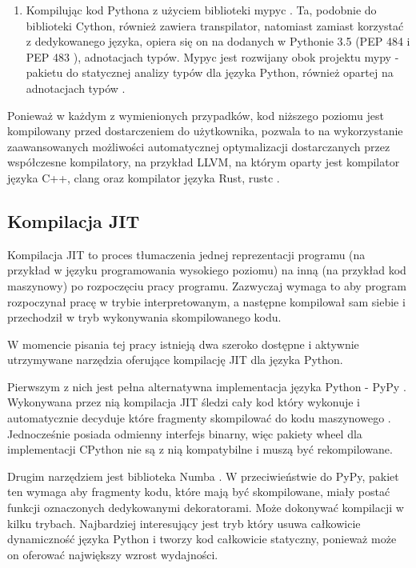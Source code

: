 \documentclass[11pt, a4paper]{article}
\begin{document}
\begin{sloppypar}
\begin{enumerate}
      \item Kompilując kod Pythona z użyciem biblioteki mypyc \cite{mypyc}. Ta, podobnie
        do biblioteki Cython, również zawiera transpilator, natomiast zamiast korzystać z
        dedykowanego języka, opiera się on na dodanych w Pythonie 3.5 \cite{Python_3_5}
        (PEP 484 \cite{PEP_484} i PEP 483 \cite{PEP_483}), adnotacjach typów. Mypyc jest
        rozwijany obok projektu mypy - pakietu do statycznej analizy typów dla języka
        Python, również opartej na adnotacjach typów \cite{mypy}.
    \end{enumerate}

    Ponieważ w każdym z wymienionych przypadków, kod niższego poziomu jest kompilowany
    przed dostarczeniem do użytkownika, pozwala to na wykorzystanie zaawansowanych możliwości
    automatycznej optymalizacji dostarczanych przez współczesne kompilatory, na przykład
    LLVM, na którym oparty jest kompilator języka C++, clang \cite{ClangHomePage} oraz
    kompilator języka Rust, rustc \cite{Rustc}.

    \subsection{Kompilacja JIT}
    Kompilacja JIT to proces tłumaczenia jednej reprezentacji programu (na przykład w
    języku programowania wysokiego poziomu) na inną (na przykład kod maszynowy) po rozpoczęciu
    pracy programu. Zazwyczaj wymaga to aby program rozpoczynał pracę w trybie
    interpretowanym, a następne kompilował sam siebie i przechodził w tryb wykonywania skompilowanego
    kodu.

    W momencie pisania tej pracy istnieją dwa szeroko dostępne i aktywnie utrzymywane narzędzia
    oferujące kompilację JIT dla języka Python.

    Pierwszym z nich jest pełna alternatywna implementacja języka Python - PyPy \cite{PyPy_Home_Page}.
    Wykonywana przez nią kompilacja JIT śledzi cały kod który wykonuje i automatycznie
    decyduje które fragmenty skompilować do kodu maszynowego \cite{PyPy_JIT}
    \cite{PyPy_JIT_Compiler}. Jednocześnie posiada odmienny interfejs binarny, więc
    pakiety wheel dla implementacji CPython nie są z nią kompatybilne i muszą być
    rekompilowane.

    Drugim narzędziem jest biblioteka Numba \cite{Numba_Article} \cite{Numba_Doc}. W przeciwieństwie
    do PyPy, pakiet ten wymaga aby fragmenty kodu, które mają być skompilowane, miały
    postać funkcji oznaczonych dedykowanymi dekoratorami. Może dokonywać kompilacji w kilku
    trybach. Najbardziej interesujący jest tryb który usuwa całkowicie dynamiczność
    języka Python i tworzy kod całkowicie statyczny, ponieważ może on oferować największy
    wzrost wydajności.


\end{sloppypar}
\end{document}
